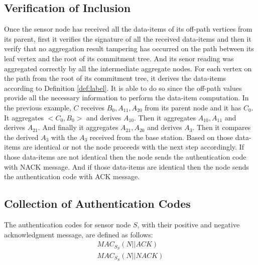 	\subsection{Verification of Inclusion}
	
		Once the sensor node has received all the data-items of its off-path vertices from its parent, first it verifies the signature of all the received data-items and then it verify that no aggregation result tampering has occurred on the path between its leaf vertex and the root of its commitment tree.
		And its senor reading was aggregated correctly by all the intermediate aggregate nodes.
		For each vertex on the path from the root of its commitment tree, it derives the data-items according to Definition \ref{def:label}.
		It is able to do so since the off-path values provide all the necessary information to perform the data-item computation.
		In the previous example, $C$ receives $B_{0}, A_{11}, A_{20}$ from its parent node and it has $C_{0}$.
		It aggregates $<C_{0}, B_{0}>$ and derives $A_{10}$.
		Then it aggregates $A_{10}, A_{11}$ and derives $A_{21}$.
		And finally it aggregates $A_{21}, A_{20}$ and derives $A_{3}$.
		Then it compares the derived $A_{3}$ with the $A_{3}$ received from the base station.
		Based on those data-items are identical or not the node proceeds with the next step accordingly.
		If those data-items are not identical then the node sends the authentication code with NACK message.
		And if those data-items are identical then the node sends the authentication code with ACK message.	

	\subsection{Collection of Authentication Codes}
		\label{subsection:collection-of-authentication-codes}
		The authentication codes for sensor node $S$, with their positive and negative acknowledgment message, are defined as follows:
		\begin{equation}
			\begin{array}{l}
				MAC_{S_{S}}(N || ACK)\\
				MAC_{S_{S}}(N || NACK)
			\end{array}
		\end{equation}

